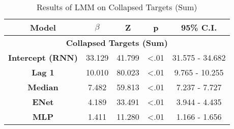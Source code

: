 \begin{table}[h]
\centering
\caption{Results of LMM on Collapsed Targets (Sum)}
\label{collapsed_target_lmm}
\begin{tabular}{ccccc}
\hline
\textbf{Model}           & \textbf{$\beta$} & \textbf{Z} & \textbf{p} & \textbf{95\% C.I.} \\ \hline
\multicolumn{5}{c}{\textbf{Collapsed Targets (Sum)}}                                                 \\ \hline
\textbf{Intercept (RNN)} & 33.129                & 41.799     & \textless .01   & 31.575 - 34.682      \\
\textbf{Lag 1}           & 10.010                 & 80.023     & \textless .01   & 9.765 - 10.255        \\
\textbf{Median}          & 7.482                 & 59.813     & \textless .01   & 7.237 - 7.727        \\
\textbf{ENet}            & 4.189                 & 33.491     & \textless .01   & 3.944 - 4.435        \\
\textbf{MLP}             & 1.411                 & 11.280     & \textless .01   & 1.166 - 1.656        \\ \hline
\end{tabular}
\end{table}